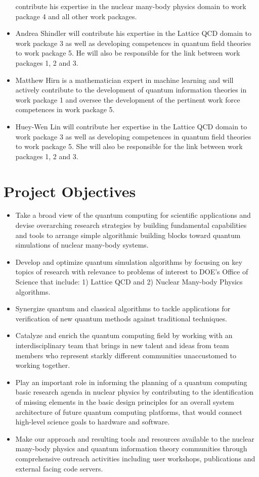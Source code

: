 \documentclass[10pt]{article}
\begin{document}
\begin{itemize}
contribute his expertise in the nuclear many-body physics domain to work package  4 and all other work packages.
\item Andrea Shindler will
contribute his expertise in the Lattice QCD domain to work package  3 as well as developing competences in quantum field theories to  work package 5. He will also be responsible for the link between work packages 1, 2 and 3. 
\item Matthew Hirn is a mathematician expert in machine learning and will actively contribute to the development of quantum information theories in work package 1 and oversee the development of the pertinent work force competences in work package 5.
\item Huey-Wen Lin will
contribute her expertise in the Lattice QCD domain to work package  3 as well as developing competences in quantum field theories to  work package 5. She will also be responsible for the link between work packages 1, 2 and 3. 
\end{itemize}




\section{Project Objectives}
\begin{itemize}
\item Take a broad view of the quantum computing for scientific applications and devise overarching
research strategies by building fundamental capabilities and tools to arrange simple
algorithmic building blocks toward quantum simulations of nuclear many-body systems.
\item  Develop and optimize quantum simulation algorithms by focusing on
key topics of research with relevance to problems of interest to DOE’s Office of Science that
include: 1) Lattice QCD and  2) Nuclear Many-body Physics algorithms.
\item  Synergize quantum and classical algorithms to tackle applications for verification of new
quantum methods against traditional techniques.
\item  Catalyze and enrich the quantum computing field by working with an interdisciplinary team
that brings in new talent and ideas from team members who represent starkly different communities
unaccustomed to working together.
\item  Play an important role in informing the planning of a quantum computing basic research
agenda in nuclear physics by contributing to the identification of missing elements in the basic design
principles for an overall system architecture of future quantum computing platforms, that
would connect high-level science goals to hardware and software.
\item  Make our approach and resulting tools and resources available to the nuclear many-body physics and quantum information theory  communities
through comprehensive outreach activities including user workshops, publications and
external facing code servers.
\end{itemize}
\end{document}
